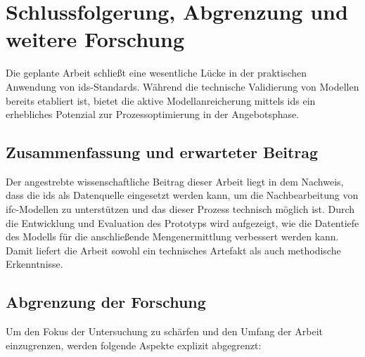 \section{Schlussfolgerung, Abgrenzung und weitere Forschung}
\label{sec:conclusion}

Die geplante Arbeit schließt eine wesentliche Lücke in der praktischen Anwendung von 
\gls{ids}-Standards. Während die technische Validierung von Modellen bereits etabliert ist, 
bietet die aktive Modellanreicherung mittels \gls{ids} ein erhebliches Potenzial zur 
Prozessoptimierung in der Angebotsphase.

\subsection{Zusammenfassung und erwarteter Beitrag}
Der angestrebte wissenschaftliche Beitrag dieser Arbeit liegt in dem Nachweis, dass 
die \gls{ids} als Datenquelle eingesetzt werden kann, um die Nachbearbeitung von 
\gls{ifc}-Modellen zu unterstützen und das dieser Prozess technisch möglich ist. 
Durch die Entwicklung und Evaluation des Prototyps wird aufgezeigt, wie die Datentiefe des Modells 
für die anschließende Mengenermittlung verbessert werden kann. 
Damit liefert die Arbeit sowohl ein technisches Artefakt als auch methodische Erkenntnisse.

\subsection{Abgrenzung der Forschung}
Um den Fokus der Untersuchung zu schärfen und den Umfang der Arbeit einzugrenzen, werden 
folgende Aspekte explizit abgegrenzt:

